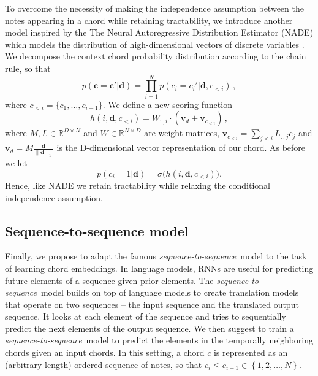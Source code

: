 \documentclass{article}
\newcommand{\R}{\mathbb{R}}
\newcommand{\boldc}{\boldsymbol c}
\newcommand{\boldd}{\boldsymbol d}
\newcommand{\boldvd}{\boldsymbol v_d}
\newcommand{\boldvci}{\boldsymbol v_{c_{<i}}}
\newcommand{\seqtoseq}{\textit{sequence-to-sequence}}
\begin{document}
To overcome the necessity of making the independence assumption between the notes appearing in a chord while retaining tractability, we introduce another model inspired by the The Neural Autoregressive Distribution Estimator (NADE) which models the distribution of high-dimensional vectors of discrete variables \citep{larochelle2011}. We decompose the context chord probability distribution according to the chain rule, so that
%
\begin{equation}
p(\boldc =\boldc' | \boldd) = \prod_{i=1}^N  p(c_i =c_i'|  \boldd, c_{<i}) \,,
\end{equation} 
%
where $c_{<i} = \{c_1, \ldots, c_{i-1}\}$. We define a new scoring function
%
\begin{equation}
h(i,\boldd,c_{<i}) =  W_{:,i} \cdot (\boldvd + \boldvci) \,,
\end{equation}
%
where $M, L \in \R^{D \times N}$ and $W\in \R^{N \times D}$ are weight matrices, $\boldvci=\sum_{j<i}  L_{:,j} c_j$ and $\boldvd = M\frac{ \boldd}{\| \boldd \|_1}$ is the D-dimensional vector representation of our chord.
As before we let
%
\begin{equation}
p(c_i =1|\boldd) = \sigma\big( h(i,\boldd,c_{<i}) \big).
\end{equation}
Hence, like NADE we retain tractability while relaxing the conditional independence assumption.
%
\subsection{Sequence-to-sequence model}
%
Finally, we propose to adapt the famous \seqtoseq\ model \citep{SutskeverVL14} to the task of learning chord embeddings. In language models, RNNs are useful for predicting future elements of a sequence given prior elements. The \seqtoseq\ model builds on top of language models  to create translation models that operate on two sequences -- the input sequence and the translated output sequence. It looks at each element of the sequence and tries to sequentially predict the next elements of the output sequence. We then suggest to train a \seqtoseq\ model to predict the elements in the temporally neighboring chords given an input chords.    
In this setting, a chord $c$ is represented as an (arbitrary length) ordered sequence of notes, so that $c_i\leq c_{i+1}\in\left\{1,2,\dots,N\right\}$.
\end{document}
